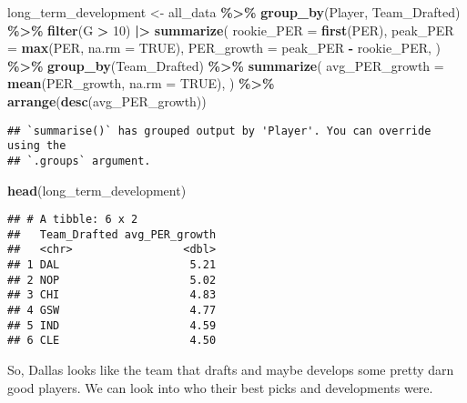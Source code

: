 \documentclass[
]{article}
\newenvironment{Shaded}{\begin{snugshade}}{\end{snugshade}}
\newcommand{\AttributeTok}[1]{\textcolor[rgb]{0.13,0.29,0.53}{#1}}
\newcommand{\ConstantTok}[1]{\textcolor[rgb]{0.56,0.35,0.01}{#1}}
\newcommand{\DecValTok}[1]{\textcolor[rgb]{0.00,0.00,0.81}{#1}}
\newcommand{\FunctionTok}[1]{\textcolor[rgb]{0.13,0.29,0.53}{\textbf{#1}}}
\newcommand{\NormalTok}[1]{#1}
\newcommand{\OtherTok}[1]{\textcolor[rgb]{0.56,0.35,0.01}{#1}}
\newcommand{\SpecialCharTok}[1]{\textcolor[rgb]{0.81,0.36,0.00}{\textbf{#1}}}
\begin{document}
\begin{Shaded}
\begin{Highlighting}[]
\NormalTok{long\_term\_development }\OtherTok{\textless{}{-}}\NormalTok{ all\_data }\SpecialCharTok{\%\textgreater{}\%}
  \FunctionTok{group\_by}\NormalTok{(Player, Team\_Drafted) }\SpecialCharTok{\%\textgreater{}\%} \FunctionTok{filter}\NormalTok{(G }\SpecialCharTok{\textgreater{}} \DecValTok{10}\NormalTok{) }\SpecialCharTok{|\textgreater{}}
  \FunctionTok{summarize}\NormalTok{(}
    \AttributeTok{rookie\_PER =} \FunctionTok{first}\NormalTok{(PER),}
    \AttributeTok{peak\_PER =} \FunctionTok{max}\NormalTok{(PER, }\AttributeTok{na.rm =} \ConstantTok{TRUE}\NormalTok{),}
    \AttributeTok{PER\_growth =}\NormalTok{ peak\_PER }\SpecialCharTok{{-}}\NormalTok{ rookie\_PER,}
\NormalTok{  ) }\SpecialCharTok{\%\textgreater{}\%}
  \FunctionTok{group\_by}\NormalTok{(Team\_Drafted) }\SpecialCharTok{\%\textgreater{}\%}
  \FunctionTok{summarize}\NormalTok{(}
    \AttributeTok{avg\_PER\_growth =} \FunctionTok{mean}\NormalTok{(PER\_growth, }\AttributeTok{na.rm =} \ConstantTok{TRUE}\NormalTok{),}
\NormalTok{  ) }\SpecialCharTok{\%\textgreater{}\%}
  \FunctionTok{arrange}\NormalTok{(}\FunctionTok{desc}\NormalTok{(avg\_PER\_growth))}
\end{Highlighting}
\end{Shaded}

\begin{verbatim}
## `summarise()` has grouped output by 'Player'. You can override using the
## `.groups` argument.
\end{verbatim}

\begin{Shaded}
\begin{Highlighting}[]
\FunctionTok{head}\NormalTok{(long\_term\_development)}
\end{Highlighting}
\end{Shaded}

\begin{verbatim}
## # A tibble: 6 x 2
##   Team_Drafted avg_PER_growth
##   <chr>                 <dbl>
## 1 DAL                    5.21
## 2 NOP                    5.02
## 3 CHI                    4.83
## 4 GSW                    4.77
## 5 IND                    4.59
## 6 CLE                    4.50
\end{verbatim}

So, Dallas looks like the team that drafts and maybe develops some
pretty darn good players. We can look into who their best picks and
developments were.
\end{document}
